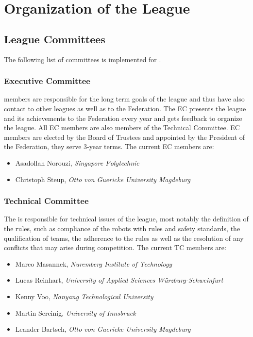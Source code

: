 \section{Organization of the League}\label{sec:organisation_of_the_league}

\subsection{League Committees}
The following list of committees is implemented for \RCAW.

\subsubsection{Executive Committee}

 members are responsible for the long term goals of the league and thus have also contact to other leagues as well as to the \RC Federation. The EC presents the league and its achievements to the \RC Federation every year and gets feedback to organize the league. All EC members are also members of the Technical Committee. EC members are elected by the Board of Trustees and appointed by the President of the \RC Federation, they serve 3-year terms. The current EC members are:

\begin{itemize}
	\item Asadollah Norouzi, \textit{Singapore Polytechnic}
    \item Christoph Steup, \textit{Otto von Guericke University Magdeburg}
\end{itemize}

\subsubsection{Technical Committee}
The  is responsible for technical issues of the league, most notably the definition of the rules, such as compliance of the robots with rules and safety standards, the qualification of teams, the adherence to the rules as well as the resolution of any conflicts that may arise during competition. The current TC members are:

\begin{itemize}
	\item Marco Masannek, \textit{Nuremberg Institute of Technology}
	\item Lucas Reinhart, \textit{University of Applied Sciences W{\"u}rzburg-Schweinfurt}
	\item Kenny Voo, \textit{Nanyang Technological University} 
	\item Martin Sereinig, \textit{University of Innsbruck} 
	\item Leander Bartsch, \textit{Otto von Guericke University Magdeburg} 
\end{itemize}

